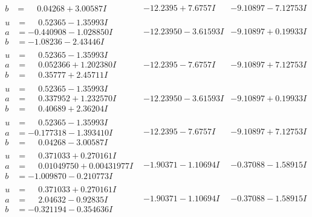 \documentclass[1p]{elsarticle_modified}
\theoremstyle{definition}
\begin{document}
$$\begin{array}{c|c|c}
\begin{aligned}
b &= \phantom{-}0.04268 + 3.00587 I\end{aligned}
 & -12.2395 + 7.6757 I & -9.10897 - 7.12753 I \\ \hline\begin{aligned}
u &= \phantom{-}0.52365 - 1.35993 I \\
a &= -0.440908 - 1.028850 I \\
b &= -1.08236 - 2.43446 I\end{aligned}
 & -12.23950 - 3.61593 I & -9.10897 + 0.19933 I \\ \hline\begin{aligned}
u &= \phantom{-}0.52365 - 1.35993 I \\
a &= \phantom{-}0.052366 + 1.202380 I \\
b &= \phantom{-}0.35777 + 2.45711 I\end{aligned}
 & -12.2395 - 7.6757 I & -9.10897 + 7.12753 I \\ \hline\begin{aligned}
u &= \phantom{-}0.52365 - 1.35993 I \\
a &= \phantom{-}0.337952 + 1.232570 I \\
b &= \phantom{-}0.40689 + 2.36204 I\end{aligned}
 & -12.23950 - 3.61593 I & -9.10897 + 0.19933 I \\ \hline\begin{aligned}
u &= \phantom{-}0.52365 - 1.35993 I \\
a &= -0.177318 - 1.393410 I \\
b &= \phantom{-}0.04268 - 3.00587 I\end{aligned}
 & -12.2395 - 7.6757 I & -9.10897 + 7.12753 I \\ \hline\begin{aligned}
u &= \phantom{-}0.371033 + 0.270161 I \\
a &= \phantom{-}0.01049750 + 0.00431977 I \\
b &= -1.009870 - 0.210773 I\end{aligned}
 & -1.90371 - 1.10694 I & -0.37088 - 1.58915 I \\ \hline\begin{aligned}
u &= \phantom{-}0.371033 + 0.270161 I \\
a &= \phantom{-}2.04632 - 0.92835 I \\
b &= -0.321194 - 0.354636 I\end{aligned}
 & -1.90371 - 1.10694 I & -0.37088 - 1.58915 I \\ \hline\begin{aligned}

\end{aligned}
\end{array}$$
\end{document}
